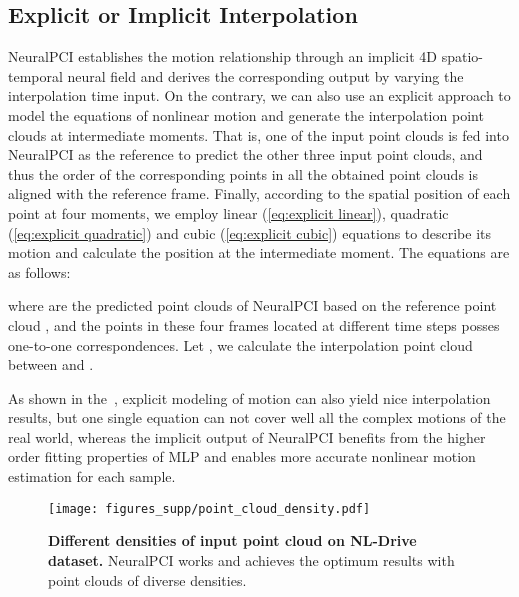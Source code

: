 \documentclass[10pt,twocolumn,letterpaper]{article}
\begin{document}
\subsection{Explicit or Implicit Interpolation}

NeuralPCI establishes the motion relationship through an implicit 4D spatio-temporal neural field and derives the corresponding output by varying the interpolation time input. On the contrary, we can also use an explicit approach to model the equations of nonlinear motion and generate the interpolation point clouds at intermediate moments. That is, one of the input point clouds is fed into NeuralPCI as the reference to predict the other three input point clouds, and thus the order of the corresponding points in all the obtained point clouds is aligned with the reference frame. Finally, according to the spatial position of each point at four moments, we employ linear (\cref{eq:explicit linear}), quadratic (\cref{eq:explicit quadratic}) and cubic (\cref{eq:explicit cubic}) equations to describe its motion and calculate the position at the intermediate moment. The equations are as follows:

\vspace{-.7cm}

\vspace{-.7cm}

\vspace{-.5cm}

\vspace{-.5cm}

\vspace{-.5cm}

where  are the predicted point clouds of NeuralPCI based on the reference point cloud , and the points in these four frames located at different time steps posses one-to-one correspondences. Let , we calculate the interpolation point cloud  between  and .


As shown in the~, explicit modeling of motion can also yield nice interpolation results, but one single equation can not cover well all the complex motions of the real world, whereas the implicit output of NeuralPCI benefits from the higher order fitting properties of MLP and enables more accurate nonlinear motion estimation for each sample.




\begin{figure}[t]
\centering
  \texttt{[image: figures\_supp/point\_cloud\_density.pdf]}
  \caption{\textbf{Different densities of input point cloud on NL-Drive dataset.} NeuralPCI works and achieves the optimum results with point clouds of diverse densities.}
  \label{fig:point_cloud_density}
\end{figure} 
\end{document}
